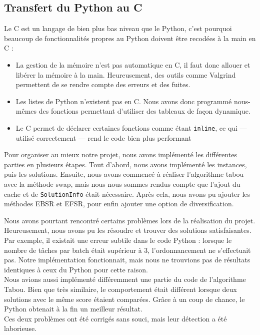 \documentclass[hideweeklyreports]{polytech/polytech}
\newcommand{\codec}[1]{\texttt{#1}}
\begin{document}
			\subsection{Transfert du Python au C}
				Le C est un langage de bien plus bas niveau que le Python, c'est pourquoi beaucoup de fonctionnalités propres au Python doivent être recodées à la main en C :
				\begin{itemize}
					\item La gestion de la mémoire n'est pas automatique en C, il faut donc allouer et libérer la mémoire à la main. Heureusement, des outils comme Valgrind permettent de se rendre compte des erreurs et des fuites.
					\item Les listes de Python n'existent pas en C. Nous avons donc programmé nous-mêmes des fonctions permettant d'utiliser des tableaux de façon dynamique.
					\item Le C permet de déclarer certaines fonctions comme étant \codec{inline}, ce qui --- utilisé correctement --- rend le code bien plus performant
				\end{itemize}
				
				Pour organiser au mieux notre projet, nous avons implémenté les différentes parties en plusieurs étapes. Tout d'abord, nous avons implémenté les instances, puis les solutions. Ensuite, nous avons commencé à réaliser l'algorithme tabou avec la méthode swap, mais nous nous sommes rendus compte que l'ajout du cache et de \codec{SolutionInfo} était nécessaire. Après cela, nous avons pu ajouter les méthodes EBSR et EFSR, pour enfin ajouter une option de diversification.
			
				Nous avons pourtant rencontré certains problèmes lors de la réalisation du projet. Heureusement, nous avons pu les résoudre et trouver des solutions satisfaisantes.\\
				Par exemple, il existait une erreur subtile dans le code Python : lorsque le nombre de tâches par batch était supérieur à 3, l'ordonnancement ne s'effectuait pas. Notre implémentation fonctionnait, mais nous ne trouvions pas de résultats identiques à ceux du Python pour cette raison.\\
				Nous avions aussi implémenté différemment une partie du code de l'algorithme Tabou. Bien que très similaire, le comportement était différent lorsque deux solutions avec le même score étaient comparées. Grâce à un coup de chance, le Python obtenait à la fin un meilleur résultat.\\
				Ces deux problèmes ont été corrigés sans souci, mais leur détection a été laborieuse.
				
\end{document}
